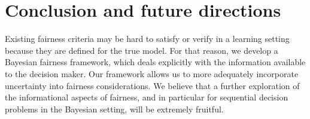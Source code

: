 \section{Conclusion and future directions}
\label{sec:conclusion}

Existing fairness criteria may be hard to satisfy or verify in a
learning setting because they are defined for the true model. For that
reason, we develop a Bayesian fairness framework, which 
deals explicitly with the information available to the decision maker.
Our framework allows us to more adequately incorporate uncertainty into fairness considerations.
We believe that a further exploration of the informational aspects of
fairness, and in particular for sequential decision problems in the Bayesian setting, will be extremely
fruitful.




